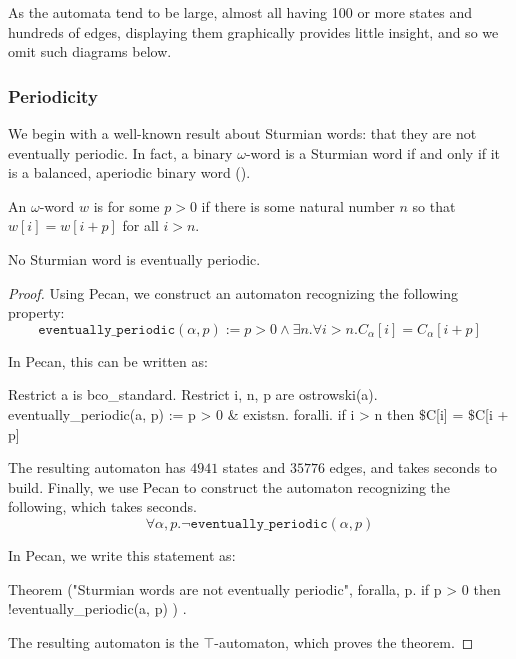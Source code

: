 As the automata tend to be large, almost all having 100 or more states and hundreds of edges, displaying them graphically provides little insight, and so we omit such diagrams below.

\subsubsection{Periodicity}

We begin with a well-known result about Sturmian words: that they are not eventually periodic.
In fact, a binary $\omega$-word is a Sturmian word if and only if it is a balanced, aperiodic binary word (\autocite[Theorem 2.1.5]{zbMATH01737190}).

\begin{definition}
    An $\omega$-word $w$ is  for some $p > 0$ if there is some natural number $n$ so that $w[i] = w[i + p]$ for all $i > n$.
\end{definition}

\begin{theorem}
No Sturmian word is eventually periodic.
\end{theorem}
\begin{proof}
Using Pecan, we construct an automaton recognizing the following property:
\[
    \texttt{eventually\_periodic}(\alpha, p) := p > 0 \land \exists n. \forall i > n. C_{\alpha}[i] = C_{\alpha}[i + p]
\]

In Pecan, this can be written as:

\begin{pecan}
Restrict a is bco_standard.
Restrict i, n, p are ostrowski(a).
eventually_periodic(a, p) := 
    p > 0 & existsn. foralli. if i > n then $\$$C[i] = $\$$C[i + p]
\end{pecan}

The resulting automaton has $4941$ states and $35776$ edges, and takes  seconds to build.
Finally, we use Pecan to construct the automaton recognizing the following, which takes  seconds.
\[
    \forall \alpha, p. \lnot \texttt{eventually\_periodic}(\alpha, p)
\]

In Pecan, we write this statement as:

\begin{pecan}
Theorem ("Sturmian words are not eventually periodic", {
    foralla, p. if p > 0 then !eventually_periodic(a, p)
}) .
\end{pecan}

The resulting automaton is the $\top$-automaton, which proves the theorem.
\end{proof}


